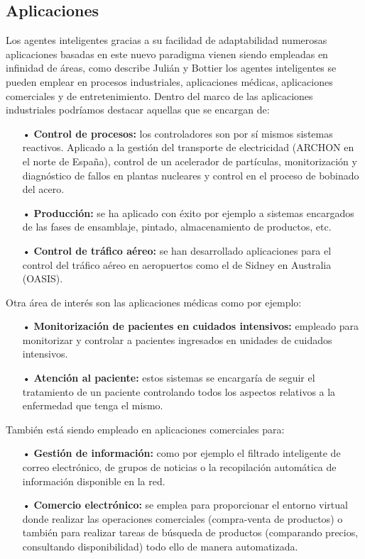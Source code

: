 \subsection{Aplicaciones}
Los agentes inteligentes gracias a su facilidad de adaptabilidad numerosas aplicaciones basadas en este nuevo paradigma vienen siendo empleadas en infinidad de áreas, como describe Julián y Bottier los agentes inteligentes se pueden emplear en procesos industriales, aplicaciones médicas, aplicaciones comerciales y de entretenimiento.
\vskip 0.1cm
Dentro del marco de las aplicaciones industriales podríamos destacar aquellas que se encargan de:

\begin{itemize}
\item[•] {\bf Control de procesos:} 
los controladores son por sí mismos sistemas reactivos. Aplicado a la gestión del transporte de electricidad (ARCHON en el norte de España), control de un acelerador de partículas, monitorización y diagnóstico de fallos en plantas nucleares y control en el proceso de bobinado del acero.

\item[•] {\bf Producción:} 
se ha aplicado con éxito por ejemplo a sistemas encargados de las fases de ensamblaje, pintado, almacenamiento de productos, etc.\vskip 0.1cm
\item[•] {\bf Control de tráfico aéreo:} 
se han desarrollado aplicaciones para el control del tráfico aéreo en aeropuertos como el de Sidney en Australia (OASIS).
\end{itemize}

Otra área de interés son las aplicaciones médicas como por ejemplo:

\begin{itemize}
\item[•] {\bf Monitorización de pacientes en cuidados intensivos:}
empleado para monitorizar y controlar a pacientes ingresados en unidades de cuidados intensivos.
\item[•] {\bf Atención al paciente:}
estos sistemas se encargaría de seguir el tratamiento de un paciente controlando todos los aspectos relativos a la enfermedad que tenga el mismo.
\end{itemize}

También está siendo empleado en aplicaciones comerciales para:

\begin{itemize}
\item[•] {\bf Gestión de información:} 
como por ejemplo el filtrado inteligente de correo electrónico, de grupos de noticias o la recopilación automática de información disponible en la red.

\item[•] {\bf Comercio electrónico:} 
se emplea para proporcionar el entorno virtual donde realizar las operaciones comerciales (compra-venta de productos) o también para realizar tareas de búsqueda de productos (comparando precios, consultando disponibilidad) todo ello de manera automatizada.
\end{itemize}

